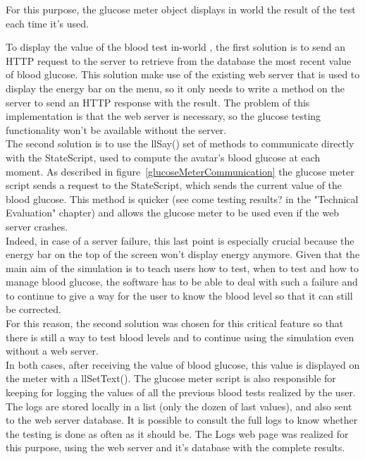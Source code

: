 \begin{itemize}
\begin{itemize}
For this purpose, the glucose meter object displays in world the result of the test each time it's used. \\

\fi


To display the value of the blood test in-world %
, the first solution is to send an HTTP request to the server to retrieve from the database the most recent value of blood glucose. 
This solution make use of the existing web server that is used to display the energy bar on the menu, so it only needs to write a method on the server to send an HTTP response with the result. 
The problem of this implementation is that the web server is necessary, so the glucose testing functionality won't be available without the server. \\

The second solution is to use the llSay() set of methods to communicate directly with the StateScript, used to compute the avatar's blood glucose at each moment. 
As described in figure~\ref{glucoseMeterCommunication} the glucose meter script sends a request to the StateScript, which sends the current value of the blood glucose.
This method is quicker (see come testing results? in the "Technical Evaluation" chapter) and allows the glucose meter to be used even if the web server crashes.\\

Indeed, in case of a server failure, this last point is especially crucial because the energy bar on the top of the screen won't display energy anymore. 
Given that the main aim of the simulation is to teach users how to test, when to test and how to manage blood glucose, the software has to be able to deal with such a failure and to continue to give a way for the user to know the blood level so that it can still be corrected. \\

For this reason, the second solution was chosen for this critical feature so that there is still a way to test blood levels and to continue using the simulation even without a web server.\\


In both cases, after receiving the value of blood glucose, this value is displayed on the meter with a llSetText(). The glucose meter script is also responsible for keeping for logging the values of all the previous blood tests realized by the user. The logs are stored locally in a list (only the dozen of last values), and also sent to the web server database. 
It is possible to consult the full logs to know whether the testing is done as often as it should be. The Logs web page was realized for this purpose, using the web server and it's database with the complete results.



\end{itemize}
\end{itemize}
